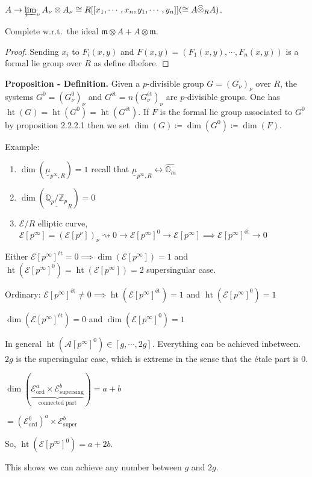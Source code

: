\documentclass{article}
\theoremstyle{definition}
\numberwithin{theorem}{subsection}
\begin{document}
    \(A \to \varprojlim_\nu A_\nu \otimes A_\nu \cong R[[x_1, \cdots , x_n, y_1, \cdots , y_n]] (\cong A \widehat{\otimes}_R A)\).

    Complete w.r.t.\ the ideal \(\mathfrak{m} \otimes A + A \otimes \mathfrak{m}\).

    \begin{proof}

        Sending \(x_i\) to \(F_i(x,y)\) and \(F(x,y)=(F_1(x,y),\cdots ,F_n(x,y))\) is a formal lie group over \(R\) as define dbefore.

    \end{proof}

    \textbf{Proposition - Definition.} Given a \(p\)-divisible group \(G = (G_\nu)_\nu\) over \(R\), the systems \(G^0 = (G^0_\nu)_\nu\) and \(G^{\text{\'et}} =n (G_\nu^{\text{\'et}})_\nu\) are \(p\)-divisible groups. One has \(\operatorname{ht}(G) = \operatorname{ht}(G^0) = \operatorname{ht}(G^{\text{\'et}})\). If \(F\) is the formal lie group associated to \(G^0\) by proposition 2.2.2.1 then we set \(\dim(G) \coloneqq \dim (G^0) \coloneqq \dim (F)\).
    
    Example:

    \begin{enumerate}[label=\arabic*)]
        \item \(\dim(\underline{\mu}_{p^{\infty},R}) = 1\) recall that \(\underline{\mu}_{p^{\infty},R} \leftrightarrow \widehat{\mathbb{G}_m}\)
        \item \(\dim(\underline{\mathbb{Q}_p / \mathbb{Z}_p}_R ) = 0\)
        \item \(\mathscr{E} / R\) elliptic curve, \(\mathscr{E}[p^{\infty}] = (\mathscr{E} [p^\nu])_\nu \rightsquigarrow 0 \to \mathscr{E} [p^{\infty}]^0 \to \mathscr{E}[p^\infty] \implies \mathscr{E}[p^{\infty}]^{\text{\'et}} \to 0\)    
    \end{enumerate} 

    Either \(\mathscr{E} [p^{\infty}]^{\text{\'et}} = 0 \implies \dim(\mathscr{E}[p^{\infty}]) = 1\) and \(\operatorname{ht}(\mathscr{E}[p^{\infty}]^0) = \operatorname{ht}(\mathscr{E}[p^{\infty}]) = 2\) supersingular case.
    
    Ordinary: \(\mathscr{E}[p^{\infty}]^{\text{\'et}} \neq 0 \implies \operatorname{ht}(\mathscr{E}[p^{\infty}]^{\text{\'et}}) = 1\) and \(\operatorname{ht}(\mathscr{E}[p^{\infty}]^0) = 1\)
    
    \(\dim (\mathscr{E}[p^{\infty}]^{\text{\'et}}) = 0\) and \(\dim(\mathscr{E}[p^{\infty}]^0) = 1\)
 

    In general \(\operatorname{ht}(\mathscr{A}[p^{\infty}]^0) \in [g, \cdots , 2g]\). Everything can be achieved inbetween. \(2g\) is the supersingular case, which is extreme in the sense that the \'etale part is \(0\).

    \(\dim \left( \underbrace{\mathscr{E}_{\text{ord}}^a \times \mathscr{E}_{\text{supersing}}^b}_{\text{connected part} } \right) = a+b\)
    
    \(= (\mathscr{E}^0_{\text{ord}})^a \times \mathscr{E}_{\text{super}}^b\)
    
    So, \(\operatorname{ht}(\mathscr{E}[p^{\infty}]^0) = a + 2b\).

    This shows we can achieve any number between \(g\) and \(2g\).
\end{document}
